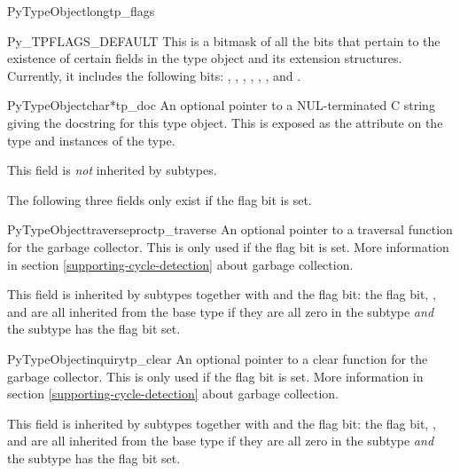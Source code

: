 \begin{cmemberdesc}{PyTypeObject}{long}{tp_flags}
  \begin{datadesc}{Py_TPFLAGS_DEFAULT}
    This is a bitmask of all the bits that pertain to the existence of
    certain fields in the type object and its extension structures.
    Currently, it includes the following bits:
    ,
    ,
    ,
    ,
    ,
    , and
    .
  \end{datadesc}
\end{cmemberdesc}

\begin{cmemberdesc}{PyTypeObject}{char*}{tp_doc}
  An optional pointer to a NUL-terminated C string giving the
  docstring for this type object.  This is exposed as the
   attribute on the type and instances of the type.

  This field is \emph{not} inherited by subtypes.
\end{cmemberdesc}

The following three fields only exist if the
 flag bit is set.

\begin{cmemberdesc}{PyTypeObject}{traverseproc}{tp_traverse}
  An optional pointer to a traversal function for the garbage
  collector.  This is only used if the 
  flag bit is set.  More information in section
  \ref{supporting-cycle-detection} about garbage collection.

  This field is inherited by subtypes together with 
  and the  flag bit: the flag bit,
  , and  are all inherited from
  the base type if they are all zero in the subtype \emph{and} the
  subtype has the  flag bit set.
\end{cmemberdesc}

\begin{cmemberdesc}{PyTypeObject}{inquiry}{tp_clear}
  An optional pointer to a clear function for the garbage collector.
  This is only used if the  flag bit is
  set.  More information in section
  \ref{supporting-cycle-detection} about garbage collection.

  This field is inherited by subtypes together with 
  and the  flag bit: the flag bit,
  , and  are all inherited from
  the base type if they are all zero in the subtype \emph{and} the
  subtype has the  flag bit set.
\end{cmemberdesc}

